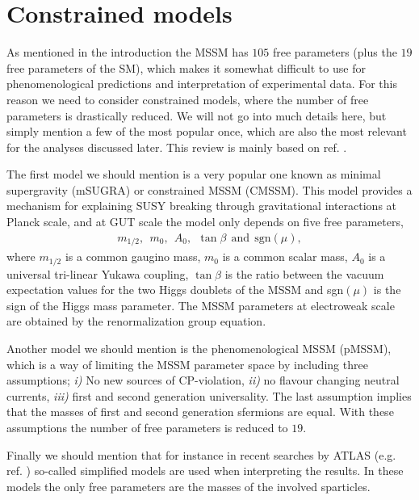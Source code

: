 \documentclass[twocolumn,a4paper,10pt]{article}
\begin{document}
\section{Constrained models}

As mentioned in the introduction the MSSM has $105$ free parameters (plus the $19$ free parameters 
of the SM), which makes it somewhat difficult to use for phenomenological predictions and interpretation 
of experimental data. For this reason we need to consider constrained models, where the number of 
free parameters is drastically reduced. We will not go into much details here, but simply mention a 
few of the most popular once, which are also the most relevant for the analyses discussed later.  
This review is mainly based on ref. \cite{Constrained models}. 

The first model we should mention is a very popular one known as minimal supergravity (mSUGRA) or 
constrained MSSM (CMSSM). This model provides a mechanism for explaining SUSY breaking through 
gravitational interactions at Planck scale, and at GUT scale the model only depends on five free 
parameters,  
\begin{align*}
m_{1/2},\:\: m_0, \:\: A_0, \:\: \tan\beta \:\:\text{and}\:\: \text{sgn}(\mu), 
\end{align*}
where $m_{1/2}$ is a common gaugino mass, $m_0$ is a common scalar mass, $A_0$ is a universal tri-linear 
Yukawa coupling, $\tan\beta$ is the ratio between the vacuum expectation values for the two Higgs 
doublets of the MSSM and sgn$(\mu)$ is the sign of the Higgs mass parameter. The MSSM parameters at 
electroweak scale are obtained by the renormalization group equation.      

Another model we should mention is the phenomenological MSSM (pMSSM), which is a way of limiting the 
MSSM parameter space by including three assumptions; \textit{i)} No new sources of CP-violation, 
\textit{ii)} no flavour changing neutral currents, \textit{iii)} first and second generation universality. 
The last assumption implies that the masses of first and second generation sfermions are equal. With 
these assumptions the number of free parameters is reduced to $19$.  

Finally we should mention that for instance in recent searches by ATLAS (e.g. ref. \cite{ATLAS:2017}) 
so-called simplified models \cite{Simplified models} are used when interpreting the results. In these 
models the only free parameters are the masses of the involved sparticles. 
\end{document}
